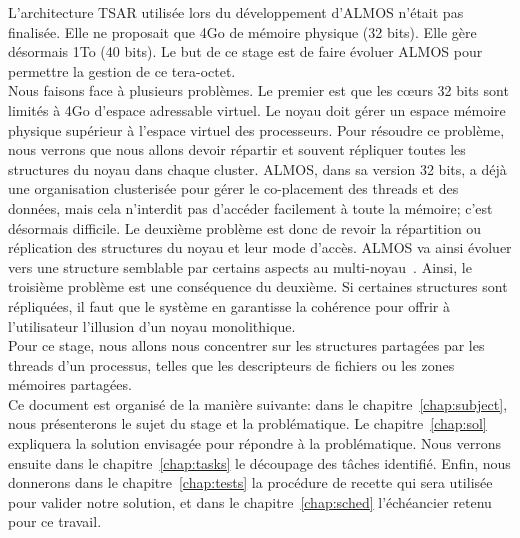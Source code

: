   \hspace{1cm}L'architecture TSAR utilisée lors du développement d'ALMOS n'était
  pas finalisée. Elle ne proposait que 4Go de mémoire physique (32 bits). Elle
  gère désormais 1To (40 bits). Le but de ce stage est de faire évoluer ALMOS
  pour permettre la gestion de ce tera-octet.\\

  \hspace{1cm}Nous faisons face à plusieurs problèmes. Le premier est que les
  c\oe urs 32 bits sont limités à 4Go d'espace adressable virtuel. Le noyau doit
  gérer un espace mémoire physique supérieur à l'espace virtuel des
  processeurs. Pour résoudre ce problème, nous verrons que nous allons devoir
  répartir et souvent répliquer toutes les structures du noyau dans chaque
  cluster. ALMOS, dans sa version 32 bits, a déjà une organisation clusterisée
  pour gérer le co-placement des threads et des données, mais cela n'interdit
  pas d'accéder facilement à toute la mémoire; c'est désormais difficile. Le
  deuxième problème est donc de revoir la répartition ou réplication des
  structures du noyau et leur mode d'accès. ALMOS va ainsi évoluer vers une
  structure semblable par certains aspects au
  multi-noyau~\citep{baumann2009multikernel}. Ainsi, le troisième problème est
  une conséquence du deuxième. Si certaines structures sont répliquées, il faut
  que le système en garantisse la cohérence pour offrir à l'utilisateur
  l'illusion d'un noyau monolithique. \\

  \hspace{1cm}Pour ce stage, nous allons nous concentrer sur les structures
  partagées par les threads d'un processus, telles que les descripteurs de
  fichiers ou les zones mémoires partagées. \\


  \hspace{1cm}Ce document est organisé de la manière suivante: dans le
  chapitre~\ref{chap:subject}, nous présenterons le sujet du stage et la
  problématique. Le chapitre~\ref{chap:sol} expliquera la solution envisagée
  pour répondre à la problématique. Nous verrons ensuite dans le
  chapitre~\ref{chap:tasks} le découpage des tâches identifié. Enfin, nous
  donnerons dans le chapitre~\ref{chap:tests} la procédure de recette qui sera
  utilisée pour valider notre solution, et dans le chapitre~\ref{chap:sched}
  l'échéancier retenu pour ce travail.
